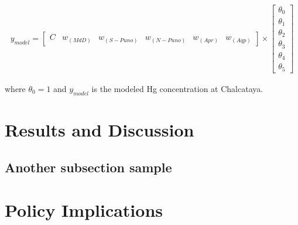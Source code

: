 \begin{align}
y_{model}=\begin{bmatrix} C & w_{(MdD)} & w_{(S-Puno)} &w_{(N-Puno)} &w_{(Apr)} &w_{(Aqp)}\end{bmatrix} × \begin{bmatrix} \theta_0 \\ \theta_1 \\ \theta_2\\ \theta_3\\ \theta_4\\ \theta_5 \end{bmatrix}
\end{align}


where $\theta_0=1$ and $y_{model}$ is the modeled Hg concentration at Chalcataya.


\section{Results and Discussion}

\subsection{Another subsection sample}

\section{Policy Implications}

